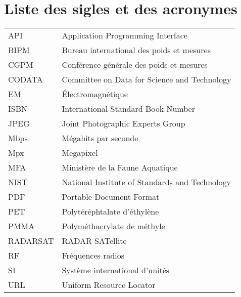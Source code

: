 
%
%

\chapter{Liste des sigles et des acronymes}


\begin{flushleft}
   \begin{tabular}{@{}ll}
      API & Application Programming Interface \\
      BIPM & Bureau international des poids et mesures\\
      CGPM & Conférence générale des poids et mesures\\
      CODATA & Committee on Data for Science and Technology\\
      EM & Électromagnétique\\
      ISBN & International Standard Book Number\\
      JPEG & Joint Photographic Experts Group\\
      Mbps & Mégabits par seconde \\
      Mpx & Megapixel \\
      MFA & Ministère de la Faune Aquatique \\
      NIST & National Institute of Standards and Technology \\
      PDF & Portable Document Format \\
      PET & Polytéréphtalate d'éthylène \\
      PMMA & Polyméthacrylate de méthyle \\
      RADARSAT & RADAR SATellite\\
      RF & Fréquences radios\\
      SI & Système international d'unités \\
      URL & Uniform Resource Locator \\
   \end{tabular}
\end{flushleft}






